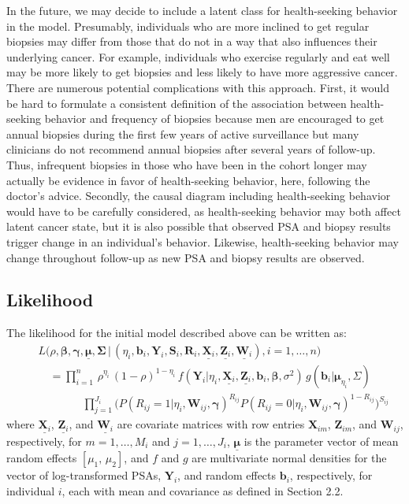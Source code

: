 \documentclass[12pt, letterpaper]{article}
\newcommand{\bmbeta}{\boldsymbol{\beta}}
\newcommand{\bmmu}{\boldsymbol{\mu}}
\newcommand{\bmgamma}{\boldsymbol{\gamma}}
\newcommand{\bmY}{\mathbf{Y}}
\newcommand{\bmZ}{\mathbf{Z}}
\newcommand{\bmX}{\mathbf{X}}
\newcommand{\bmW}{\mathbf{W}}
\newcommand{\bmR}{\mathbf{R}}
\newcommand{\bmS}{\mathbf{S}}
\newcommand{\bmb}{\mathbf{b}}
\newcommand{\bmSigma}{\boldsymbol{\Sigma}}
\newcommand{\beas}{\begin{eqnarray*}}
\newcommand{\eeas}{\end{eqnarray*}}
\begin{document}
In the future, we may decide to include a latent class for health-seeking behavior in the model. Presumably, individuals who are more inclined to get regular biopsies may differ from those that do not in a way that also influences their underlying cancer. For example, individuals who exercise regularly and eat well may be more likely to get biopsies and less likely to have more aggressive cancer. There are numerous potential complications with this approach. First, it would be hard to formulate a consistent definition of the association between health-seeking behavior and frequency of biopsies because men are encouraged to get annual biopsies during the first few years of active surveillance but many clinicians do not recommend annual biopsies after several years of follow-up. Thus, infrequent biopsies in those who have been in the cohort longer may actually be evidence in favor of health-seeking behavior, here, following the doctor's advice.  Secondly, the causal diagram including health-seeking behavior would have to be carefully considered, as health-seeking behavior may both affect latent cancer state, but it is also possible that observed PSA and biopsy results trigger change in an individual's behavior. Likewise, health-seeking behavior may change throughout follow-up as new PSA and biopsy results are observed. 



\subsection{Likelihood}

The likelihood for the initial model described above can be written as:
\beas
&&L\big(\rho, \bmbeta,\bmgamma, \underline{\bmmu}, \bmSigma  \, | \,(\eta_i, \bmb_i, \bmY_i, \bmS_i, \bmR_i,  \underline{\bmX_i}, \underline{\bmZ_i}, \underline{\bmW_i}), i=1,\dots,n \big) \\
&& \quad =  \prod_{i=1}^{n}  \,  \rho^{\eta_i}\,(1-\rho)^{1-\eta_i}\, f(\bmY_i | \eta_i, \underline{\bmX_i}, \underline{\bmZ_i}, \bmb_i, \bmbeta, \sigma^2) \, g(\bmb_i |  \bmmu_{\eta_i}, \Sigma)  \\
&& \qquad \qquad \prod_{j=1}^{J_i} \big( P(R_{ij}=1 | \eta_i, \bmW_{ij}, \bmgamma) ^{R_{ij}} P(R_{ij}=0 | \eta_i, \bmW_{ij}, \bmgamma)^{1-R_{ij}} \big)^{S_{ij}} 
\eeas
where $\underline{\bmX_i}$,  $\underline{\bmZ_i}$, and $\underline{\bmW_i}$ are covariate matrices with row entries $\bmX_{im}$, $\bmZ_{im}$, and $\bmW_{ij}$, respectively, for $m=1,\dots, M_i$ and $j=1,\dots, J_i$, $\underline{\bmmu}$ is the parameter vector of mean random effects $[\mu_1,\,\mu_2]$, and $f$ and $g$ are multivariate normal densities for the vector of log-transformed PSAs, $\bmY_i$, and random effects $\bmb_i$, respectively, for individual $i$, each with mean and covariance as defined in Section 2.2.
\end{document}
